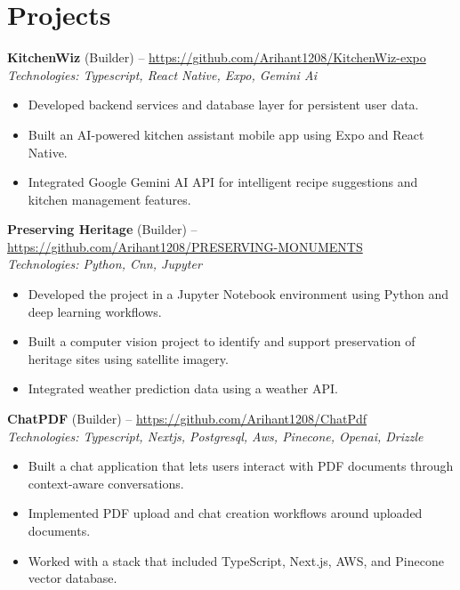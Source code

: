 \documentclass[11pt,a4paper]{article}
\begin{document}
\section{Projects}
\textbf{KitchenWiz} (Builder) -- \href{https://github.com/Arihant1208/KitchenWiz-expo}{https://github.com/Arihant1208/KitchenWiz-expo}
\\ \textit{Technologies: Typescript, React Native, Expo, Gemini Ai}
\begin{itemize}
  \item Developed backend services and database layer for persistent user data.
  \item Built an AI-powered kitchen assistant mobile app using Expo and React Native.
  \item Integrated Google Gemini AI API for intelligent recipe suggestions and kitchen management features.
\end{itemize}
\vspace{2pt}
\textbf{Preserving Heritage} (Builder) -- \href{https://github.com/Arihant1208/PRESERVING-MONUMENTS}{https://github.com/Arihant1208/PRESERVING-MONUMENTS}
\\ \textit{Technologies: Python, Cnn, Jupyter}
\begin{itemize}
  \item Developed the project in a Jupyter Notebook environment using Python and deep learning workflows.
  \item Built a computer vision project to identify and support preservation of heritage sites using satellite imagery.
  \item Integrated weather prediction data using a weather API.
\end{itemize}
\vspace{2pt}
\textbf{ChatPDF} (Builder) -- \href{https://github.com/Arihant1208/ChatPdf}{https://github.com/Arihant1208/ChatPdf}
\\ \textit{Technologies: Typescript, Nextjs, Postgresql, Aws, Pinecone, Openai, Drizzle}
\begin{itemize}
  \item Built a chat application that lets users interact with PDF documents through context-aware conversations.
  \item Implemented PDF upload and chat creation workflows around uploaded documents.
  \item Worked with a stack that included TypeScript, Next.js, AWS, and Pinecone vector database.
\end{itemize}
\vspace{2pt}
\end{document}
